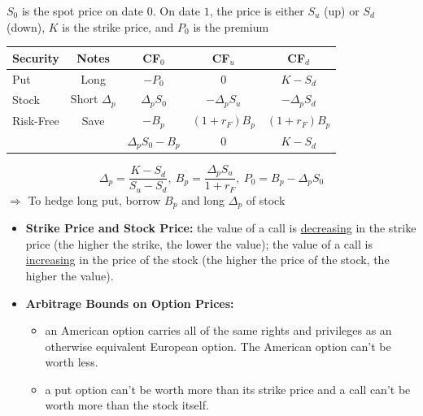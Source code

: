\documentclass{beamer}
\begin{document}
\begin{frame}{}
	$S_{0}$ is the spot price on date $0$. On date $1$, the price is either $S_{u}$ (up) or $S_{d}$ (down), $K$ is the strike price, and $P_{0}$ is the premium
    \begin{center}
        \begin{tabular}{lcccc}
			Security & Notes & CF$_{0}$ & CF$_{u}$ & CF$_{d}$ \\ \hline\hline
			Put & Long & $-P_{0}$ & $0$ &$K-S_{d}$\\ \hline\hline
			Stock & Short $\Delta_{p}$ & $\Delta_{p} S_{0}$ & $-\Delta_{p} S_{u}$ & $-\Delta_{p} S_{d}$ \\
			Risk-Free & Save & $-B_{p}$ & $(1+r_{F})B_{p}$ & $(1+r_{F})B_{p}$\\ \hline
			& & $\Delta_{p} S_{0}-B_{p}$ & $0$ & $K-S_{d}$ \\ \hline\hline
        \end{tabular}
    \end{center}
	\begin{equation}
		\boxed{\Delta_{p}=\frac{K-S_{d}}{S_{u}-S_{d}},\:B_{p}=\frac{\Delta_{p}S_{u}}{1+r_{F}},\:P_{0}=B_{p}-\Delta_{p}S_{0}}
	\end{equation}
	$\Rightarrow$ To hedge long put, borrow $B_{p}$ and long $\Delta_{p}$ of stock 
\end{frame}

\begin{frame}{}
	
\end{frame}

\begin{frame}{}
	\begin{itemize}
		\item \textbf{Strike Price and Stock Price:} the value of a call is \underline{decreasing} in the strike price (the higher the strike, the lower the value); the value of a call is \underline{increasing} in the price of the stock (the higher the price of the stock, the higher the value). 
		\item \textbf{Arbitrage Bounds on Option Prices:} 
		\begin{itemize}
			\item an American option carries all of the same rights and privileges as an otherwise equivalent European option. The American option can't be worth less. 
			\item a put option can't be worth more than its strike price and a call can't be worth more than the stock itself.
		\end{itemize}
	\end{itemize}
\end{frame}
\end{document}
